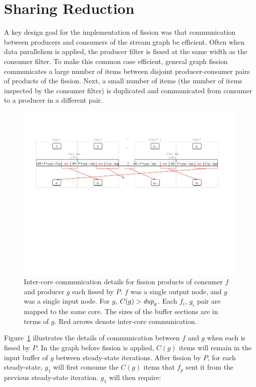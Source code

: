 \section{Sharing Reduction}

A key design goal for the implementation of fission was that
communication between producers and consumers of the stream graph be
efficient.  Often when data parallelism is applied, the producer
filter is fissed at the same width as the consumer filter.  To make
this common case efficient, general graph fission communicates a large
number of items between disjoint producer-consumer pairs of products
of the fission.  Next, a small number of items (the number of items
inspected by the consumer filter) is duplicated and communicated from
consumer to a producer in a different pair.

\begin{figure}[t]
\centering
\includegraphics[width=\textwidth]{figures/remaining-dup-case.pdf}
\caption[Extra inter-core communication when $C(g) > \mt{dup}_g$.]
{  Inter-core communication details for fission products of consumer $f$
   and producer $g$ each fissed by $P$.  $f$ was a single output node,
   and $g$ was a single input node.  For $g$, $C(g) > \mt{dup}_g$.
   Each $f_i$, $g_i$ pair are mapped to the same core.
   The sizes of the buffer sections are in terms of $g$. Red arrows
   denote inter-core communication.\label{fig:remaining-dup}}
 \end{figure}

 Figure~\ref{fig:remaining-dup} illustrates the details of
 communication between $f$ and $g$ when each is fissed by $P$.  In the
 graph before fission is applied, $C(g)$ items will remain in the
 input buffer of $g$ between steady-state iterations.  After fission by $P$,
 for each steady-state, $g_1$ will first consume the $C(g)$ items that
 $f_p$ sent it from the previous steady-state iteration.  $g_1$ will
 then require:

